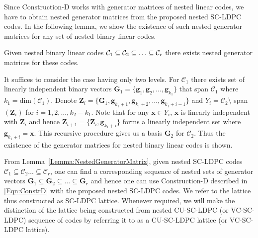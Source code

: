 \documentclass[journal,draftcls,onecolumn,12pt,twoside]{IEEEtran}
\begin{document}
Since Construction-D works with generator matrices of nested linear codes, we have to obtain nested generator matrices from the proposed nested SC-LDPC codes. In the following lemma, we show the existence of such nested generator matrices for any set of nested binary linear codes.
\begin{lemma}\label{Lemma:NestedGeneratorMatrix}
    Given nested binary linear codes $\mathcal{C}_{1}\subseteq \mathcal{C}_{2}\subseteq\ldots \subseteq\mathcal{C}_{r}$ there exists nested generator matrices for these codes.
\end{lemma}
\begin{IEEEproof}
It suffices to consider the case having only two levels. For $\mathcal{C}_{1}$ there exists set of linearly independent binary vectors
$\mathbf{G}_{1}=\{\mathbf{g}_1,\mathbf{g}_2,\ldots, \mathbf{g}_{k_1}\}$ that span $\mathcal{C}_{1}$ where $k_{1}=$dim$(\mathcal{C}_{1})$.
Denote $\mathbf{Z}_{i}=\{\mathbf{G}_{1},\mathbf{g}_{k_{1}+1},\mathbf{g}_{k_{1}+2}, \ldots, \mathbf{g}_{k_{1}+i-1}\}$ and $Y_{i}=\mathcal{C}_{2}\setminus$
span$(\mathbf{Z}_{i})$ for $i=1,2, \ldots, k_{2}-k_{1}$. Note that for any $\mathbf{x}\in Y_{i}$, $\mathbf{x}$ is linearly independent with $\mathbf{Z}_{i}$ and hence
$\mathbf{Z}_{i+1}=\{\mathbf{Z}_{i},\mathbf{g}_{k_{1}+i}\}$ forms a linearly independent set where $\mathbf{g}_{k_{1}+i}=\mathbf{x}$. This recursive procedure gives us a basis $\mathbf{G}_{2}$ for $\mathcal{C}_{2}$. Thus the existence of the generator matrices for nested binary linear codes is shown.
\end{IEEEproof}
From Lemma~\ref{Lemma:NestedGeneratorMatrix}, given nested SC-LDPC codes $\mathcal{C}_{1}\subseteq \mathcal{C}_{2}\ldots \subseteq\mathcal{C}_{r}$, one can find a corresponding sequence of nested sets of generator vectors $\mathbf{G}_{1}\subseteq \mathbf{G}_{2} \subseteq \ldots \subseteq\mathbf{G}_{r}$ and hence one can use Construction-D described in \eqref{Eqn:ConstrD} with the proposed nested SC-LDPC codes. We refer to the lattice thus constructed as SC-LDPC lattice. Whenever required, we will make the distinction of the lattice being constructed from nested CU-SC-LDPC (or VC-SC-LDPC) sequence of codes by referring it to as a CU-SC-LDPC lattice (or VC-SC-LDPC lattice). 
\end{document}
